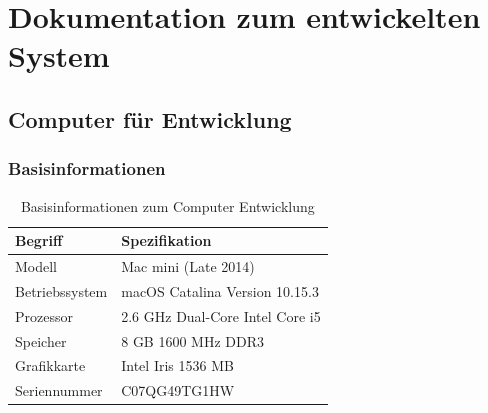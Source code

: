 \section{Dokumentation zum entwickelten System }
\subsection{Computer für Entwicklung}
\subsubsection{Basisinformationen}
\begin{table}[H]
	
	\begin{tabular}{p{6cm} p{8cm}}
		
		\toprule[1pt]
		\rowcolor{maroon!30}
		
		Begriff & Spezifikation\\
		
		\midrule 
		Modell & Mac mini (Late 2014) \\
		Betriebssystem & macOS Catalina Version 10.15.3\\
		Prozessor & 2.6 GHz Dual-Core Intel Core i5\\
		Speicher &  8 GB 1600 MHz DDR3\\
		Grafikkarte & Intel Iris 1536 MB\\
		Seriennummer & C07QG49TG1HW\\
		
		\bottomrule
	\end{tabular}
	\caption{Basisinformationen zum Computer Entwicklung}
	\label{fig: Basisinformationen zum Computer Entwicklung}
\end{table}

